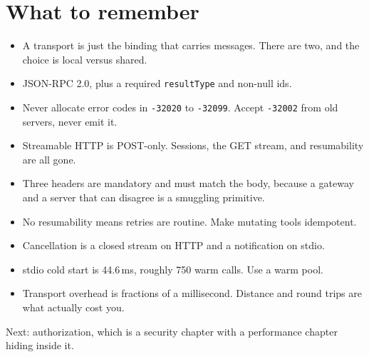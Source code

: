 \section{What to remember}

\begin{itemize}[leftmargin=1.6em, itemsep=3pt]
\item A transport is just the binding that carries messages. There are two, and
the choice is local versus shared.
\item JSON-RPC 2.0, plus a required \texttt{resultType} and non-null ids.
\item Never allocate error codes in \texttt{-32020} to \texttt{-32099}. Accept
\texttt{-32002} from old servers, never emit it.
\item Streamable HTTP is POST-only. Sessions, the GET stream, and resumability
are all gone.
\item Three headers are mandatory and must match the body, because a gateway and
a server that can disagree is a smuggling primitive.
\item No resumability means retries are routine. Make mutating tools idempotent.
\item Cancellation is a closed stream on HTTP and a notification on stdio.
\item stdio cold start is 44.6\,ms, roughly 750 warm calls. Use a warm pool.
\item Transport overhead is fractions of a millisecond. Distance and round trips
are what actually cost you.
\end{itemize}

Next: authorization, which is a security chapter with a performance chapter
hiding inside it.
